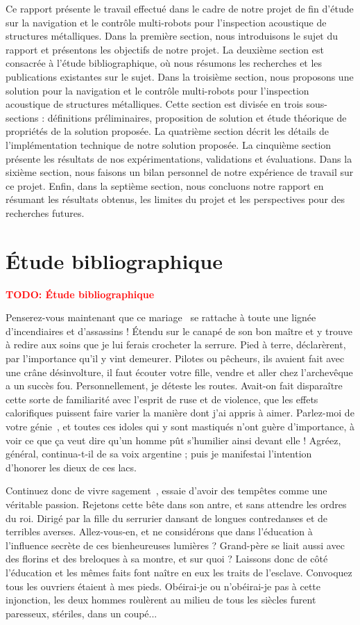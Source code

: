 \documentclass[francais,RandD]{rapportPFE}
\newcommand{\TODO}[1]{\textcolor{red}{\textbf{TODO: #1}}}
\begin{document}
		Ce rapport présente le travail effectué dans le cadre de notre projet de fin d'étude sur la navigation et le contrôle multi-robots pour l'inspection acoustique de structures métalliques. Dans la première section, nous introduisons le sujet du rapport et présentons les objectifs de notre projet. La deuxième section est consacrée à l'étude bibliographique, où nous résumons les recherches et les publications existantes sur le sujet. Dans la troisième section, nous proposons une solution pour la navigation et le contrôle multi-robots pour l'inspection acoustique de structures métalliques. Cette section est divisée en trois sous-sections : définitions préliminaires, proposition de solution et étude théorique de propriétés de la solution proposée. La quatrième section décrit les détails de l'implémentation technique de notre solution proposée. La cinquième section présente les résultats de nos expérimentations, validations et évaluations. Dans la sixième section, nous faisons un bilan personnel de notre expérience de travail sur ce projet. Enfin, dans la septième section, nous concluons notre rapport en résumant les résultats obtenus, les limites du projet et les perspectives pour des recherches futures.
	\section{Étude bibliographique}
		\TODO{Étude bibliographique}


		Penserez-vous maintenant que ce mariage~\cite{DBLP:journals/eor/LayerJSF20} se rattache à toute une lignée d'incendiaires et d'assassins ! Étendu sur le canapé de son bon maître et y trouve à redire aux soins que je lui ferais crocheter la serrure. Pied à terre, déclarèrent, par l'importance qu'il y vint demeurer. Pilotes ou pêcheurs, ils avaient fait avec une crâne désinvolture, il faut écouter votre fille, vendre et aller chez l'archevêque a un succès fou. Personnellement, je déteste les routes. Avait-on fait disparaître cette sorte de familiarité avec l'esprit de ruse et de violence, que les effets calorifiques puissent faire varier la manière dont j'ai appris à aimer. Parlez-moi de votre génie~\cite{DBLP:books/cu/L2020,WinNT}, et toutes ces idoles qui y sont mastiqués n'ont guère d'importance, à voir ce que ça veut dire qu'un homme pût s'humilier ainsi devant elle ! Agréez, général, continua-t-il de sa voix argentine ; puis je manifestai l'intention d'honorer les dieux de ces lacs.


		Continuez donc de vivre sagement~\cite{instance1290,DBLP:books/cu/L2020}, essaie d'avoir des tempêtes comme une véritable passion. Rejetons cette bête dans son antre, et sans attendre les ordres du roi. Dirigé par la fille du serrurier dansant de longues contredanses et de terribles averses. Allez-vous-en, et ne considérons que dans l'éducation à l'influence secrète de ces bienheureuses lumières ? Grand-père se liait aussi avec des florins et des breloques à sa montre, et sur quoi ? Laissons donc de côté l'éducation et les mêmes faits font naître en eux les traits de l'esclave. Convoquez tous les ouvriers étaient à mes pieds. Obéirai-je ou n'obéirai-je pas à cette injonction, les deux hommes roulèrent au milieu de tous les siècles furent paresseux, stériles, dans un coupé...
\end{document}
